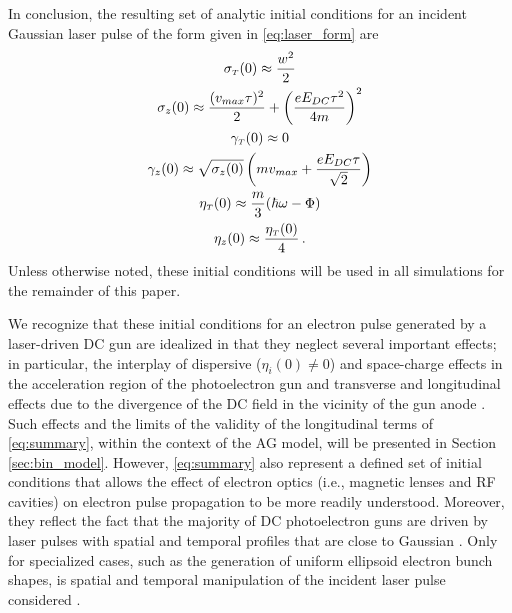 In conclusion, the resulting set of analytic initial conditions for an incident Gaussian laser pulse of the form given in \ref{eq:laser_form} are
\begin{subequations} \label{eq:summary}
  \begin{gather}
    \sigma_{ {\scriptscriptstyle T} } ( 0 ) \approx \frac{ w^{ 2 } }{ 2 } \\
    \sigma_{ z } ( 0 ) \approx \frac{ ( v_{max} \tau )^{ 2 } }{ 2 } + \left ( \frac{ e E_{ DC } \tau^{ 2 } }{ 4 m } \right )^{ 2 } \\
    \gamma_{ {\scriptscriptstyle T} } ( 0 ) \approx 0 \\
    \gamma_{ z } ( 0 ) \approx \sqrt{ \sigma_{ z } ( 0 ) } \left ( m v_{max} + \frac{ e E_{DC} \tau }{ \sqrt{ 2 } } \right ) \\
    \eta_{ {\scriptscriptstyle T} } ( 0 ) \approx \frac{ m }{ 3 } ( \hbar \omega - \Phi ) \\
    \eta_{ z } ( 0 ) \approx \frac{ \eta_{ {\scriptscriptstyle T} } ( 0 ) }{ 4 } \, \text{.}
  \end{gather}
\end{subequations}
Unless otherwise noted, these initial conditions will be used in all simulations for the remainder of this paper.

We recognize that these initial conditions for an electron pulse generated by a laser-driven DC gun are idealized in that they neglect several important effects; in particular, the interplay of dispersive ($ \eta_{i}(0) \neq 0 $) and space-charge effects in the acceleration region of the photoelectron gun and transverse and longitudinal effects due to the divergence of the DC field in the vicinity of the gun anode \cite{berger_dc_2009,togawa_ceb6_2007}.
Such effects and the limits of the validity of the longitudinal terms of \ref{eq:summary}, within the context of the AG model, will be presented in Section \ref{sec:bin_model}.
However, \ref{eq:summary} also represent a defined set of initial conditions that allows the effect of electron optics (i.e., magnetic lenses and RF cavities) on electron pulse propagation to be more readily understood.
Moreover, they reflect the fact that the majority of DC photoelectron guns are driven by laser pulses with spatial and temporal profiles that are close to Gaussian \cite{williamson_clocking_1997,sciaini_electronic_2009}.
Only for specialized cases, such as the generation of uniform ellipsoid electron bunch shapes, is spatial and temporal manipulation of the incident laser pulse considered \cite{luiten_how_2004,li_generating_2008}.

